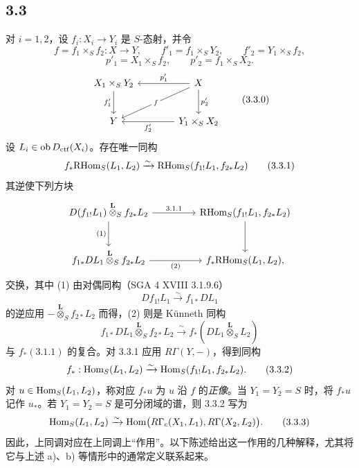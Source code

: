 \subsection*{3.3}
对 $i=1,2$，设 $f_i:X_i\to Y_i$ 是 $S$-态射，并令
\[
f=f_1\times_S f_2:X\to Y,
\qquad
f'_1=f_1\times_S Y_2,
\qquad
f'_2=Y_1\times_S f_2,
\]
\[
p'_1=X_1\times_S f_2,
\qquad
p'_2=f_1\times_S X_2.
\]
\begin{equation}
\begin{tikzcd}[column sep=3.8em,row sep=2.4em]
X_1\times_S Y_2 \arrow[d,"f'_1"'] & X \arrow[l,"p'_1"'] \arrow[dl,"f" description] \arrow[d,"p'_2"] \\
Y & Y_1\times_S X_2 \arrow[l,"f'_2"]
\end{tikzcd}
\tag{3.3.0}
\end{equation}
设 $L_i\in\operatorname{ob}D_{\mathrm{ctf}}(X_i)$。存在唯一同构
\begin{equation}
f_*\mathrm{RHom}_S(L_1,L_2)
\xrightarrow{\sim}
\mathrm{RHom}_S(f_{1!}L_1,f_{2*}L_2)
\tag{3.3.1}
\end{equation}
其逆使下列方块
\[
\begin{tikzcd}[column sep=4.5em,row sep=2.6em]
D(f_{1!}L_1)\overset{\mathbf L}{\otimes}_S f_{2*}L_2
  \arrow[r,"3.1.1"] \arrow[d,"(1)"']
& \RHom_S(f_{1!}L_1,f_{2*}L_2) \arrow[d] \\
f_{1*}DL_1\overset{\mathbf L}{\otimes}_S f_{2*}L_2
  \arrow[r,"(2)"']
& f_*\RHom_S(L_1,L_2),
\end{tikzcd}
\]
交换，其中 (1) 由对偶同构（SGA 4 XVIII 3.1.9.6）
\[
Df_{1!}L_1\xrightarrow{\sim}f_{1*}DL_1
\]
的逆应用 $-\overset{\mathbf L}{\otimes}_S f_{2*}L_2$ 而得，(2) 则是 Künneth 同构
\[
f_{1*}DL_1\overset{\mathbf L}{\otimes}_S f_{2*}L_2
\xrightarrow{\sim}
f_*(DL_1\overset{\mathbf L}{\otimes}_S L_2)
\]
与 $f_*(3.1.1)$ 的复合。对 3.3.1 应用 $R\Gamma(Y,-)$，得到同构
\begin{equation}
f_*:\operatorname{Hom}_S(L_1,L_2)
\xrightarrow{\sim}
\operatorname{Hom}_S(f_{1!}L_1,f_{2*}L_2).
\tag{3.3.2}
\end{equation}
对 $u\in\operatorname{Hom}_S(L_1,L_2)$，称对应 $f_*u$ 为 $u$ 沿 $f$ 的\emph{正像}。当 $Y_1=Y_2=S$ 时，将 $f_*u$ 记作 $u_*$。若 $Y_1=Y_2=S$ 是可分闭域的谱，则 3.3.2 写为
\begin{equation}
\operatorname{Hom}_S(L_1,L_2)
\xrightarrow{\sim}
\operatorname{Hom}\bigl(R\Gamma_c(X_1,L_1),R\Gamma(X_2,L_2)\bigr).
\tag{3.3.3}
\end{equation}
因此，上同调对应在上同调上“作用”。以下陈述给出这一作用的几种解释，尤其将它与上述 a)、b) 等情形中的通常定义联系起来。

